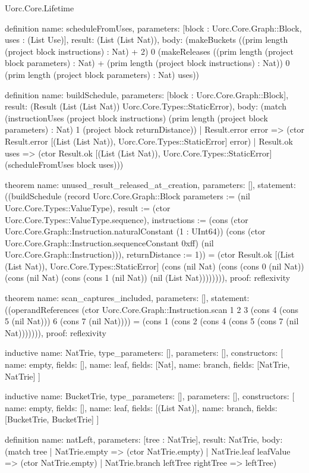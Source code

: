 \begin{lexlean}{Uorc.Core.Lifetime}
\begin{semanticmodule}
definition{
  name: scheduleFromUses,
  parameters: [block : Uorc.Core.Graph::Block, uses : (List Use)],
  result: (List (List Nat)),
  body: (makeBuckets ((prim length (project block instructions) : Nat) + 2) 0 (makeReleases ((prim length (project block parameters) : Nat) + (prim length (project block instructions) : Nat)) 0 (prim length (project block parameters) : Nat) uses))
}

definition{
  name: buildSchedule,
  parameters: [block : Uorc.Core.Graph::Block],
  result: (Result (List (List Nat)) Uorc.Core.Types::StaticError),
  body: (match (instructionUses (project block instructions) (prim length (project block parameters) : Nat) 1 (project block returnDistance))
    | Result.error error => (ctor Result.error [(List (List Nat)), Uorc.Core.Types::StaticError] error)
    | Result.ok uses => (ctor Result.ok [(List (List Nat)), Uorc.Core.Types::StaticError] (scheduleFromUses block uses)))
}

theorem{
  name: unused_result_released_at_creation,
  parameters: [],
  statement: ((buildSchedule (record Uorc.Core.Graph::Block {parameters := (nil Uorc.Core.Types::ValueType), result := (ctor Uorc.Core.Types::ValueType.sequence), instructions := (cons (ctor Uorc.Core.Graph::Instruction.naturalConstant (1 : UInt64)) (cons (ctor Uorc.Core.Graph::Instruction.sequenceConstant 0xff) (nil Uorc.Core.Graph::Instruction))), returnDistance := 1})) = (ctor Result.ok [(List (List Nat)), Uorc.Core.Types::StaticError] (cons (nil Nat) (cons (cons 0 (nil Nat)) (cons (nil Nat) (cons (cons 1 (nil Nat)) (nil (List Nat)))))))),
  proof: reflexivity{}
}

theorem{
  name: scan_captures_included,
  parameters: [],
  statement: ((operandReferences (ctor Uorc.Core.Graph::Instruction.scan 1 2 3 (cons 4 (cons 5 (nil Nat))) 6 (cons 7 (nil Nat)))) = (cons 1 (cons 2 (cons 4 (cons 5 (cons 7 (nil Nat))))))),
  proof: reflexivity{}
}

inductive{
  name: NatTrie,
  type_parameters: [],
  parameters: [],
  constructors: [
    {name: empty, fields: []},
    {name: leaf, fields: [Nat]},
    {name: branch, fields: [NatTrie, NatTrie]}
  ]
}

inductive{
  name: BucketTrie,
  type_parameters: [],
  parameters: [],
  constructors: [
    {name: empty, fields: []},
    {name: leaf, fields: [(List Nat)]},
    {name: branch, fields: [BucketTrie, BucketTrie]}
  ]
}

definition{
  name: natLeft,
  parameters: [tree : NatTrie],
  result: NatTrie,
  body: (match tree
    | NatTrie.empty => (ctor NatTrie.empty)
    | NatTrie.leaf leafValue => (ctor NatTrie.empty)
    | NatTrie.branch leftTree rightTree => leftTree)
}


\end{semanticmodule}
\end{lexlean}
